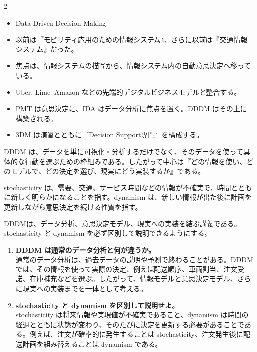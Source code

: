 \begin{multicols}{2}

\footnotesize

\raggedcolumns


\begin{itemize}
\item Data Driven Decision Making
\item 以前は『モビリティ応用のための情報システム』、さらに以前は『交通情報システム』だった。
\item 焦点は、情報システムの描写から、情報システム内の自動意思決定へ移っている。
\item Uber, Lime, Amazon などの先端的デジタルビジネスモデルと整合する。
\item PMT は意思決定に、IDA はデータ分析に焦点を置く。DDDM はその上に構築される。
\item 3DM は演習とともに『Decision Support専門』を構成する。
\end{itemize}

DDDM は、データを単に可視化・分析するだけでなく、そのデータを使って具体的な行動を選ぶための枠組みである。したがって中心は『どの情報を使い、どのモデルで、どの決定を選び、現実にどう実装するか』である。\par

stochasticity は、需要、交通、サービス時間などの情報が不確実で、時間とともに新しく明らかになることを指す。dynamism は、新しい情報が出た後に計画を更新しながら意思決定を続ける性質を指す。\par

DDDMは、データ分析、意思決定モデル、現実への実装を結ぶ講義である。stochasticity と dynamism を必ず区別して説明できるようにする。\par

\begin{enumerate}
\item \textbf{DDDM は通常のデータ分析と何が違うか。}\\
通常のデータ分析は、過去データの説明や予測で終わることがある。DDDMでは、その情報を使って実際の決定、例えば配送順序、車両割当、注文受諾、在庫補充などを選ぶ。したがって、情報モデルと意思決定モデル、さらに現実への実装までを一体として考える。
\item \textbf{stochasticity と dynamism を区別して説明せよ。}\\
stochasticity は将来情報や実現値が不確実であること、dynamism は時間の経過とともに状態が変わり、そのたびに決定を更新する必要があることである。例えば、注文が確率的に発生することは stochasticity、注文発生後に配送計画を組み替えることは dynamism である。
\end{enumerate}

\end{multicols}

